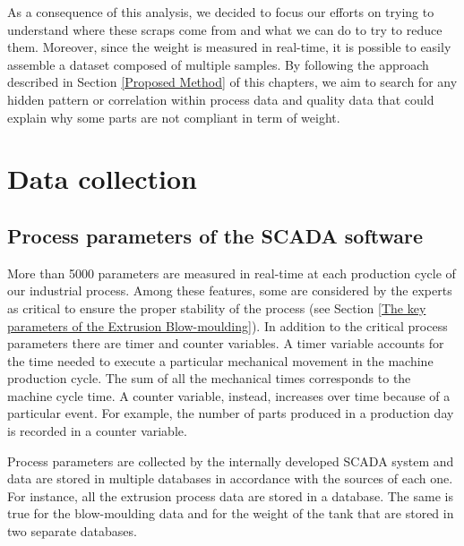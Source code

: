 As a consequence of this analysis, we decided to focus our efforts on trying to understand where these scraps come from and what we can do to try to reduce them. Moreover, since the weight is measured in real-time, it is possible to easily assemble a dataset composed of multiple samples. By following the approach described in Section \ref{Proposed Method} of this chapters, we aim to search for any hidden pattern or correlation within process data and quality data that could explain why some parts are not compliant in term of weight.


\section{Data collection}

\subsection{Process parameters of the SCADA software}

More than 5000 parameters are measured in real-time at each production cycle of our industrial process. Among these features, some are considered by the experts as critical to ensure the proper stability of the process (see Section \ref{The key parameters of the Extrusion Blow-moulding}). In addition to the critical process parameters there are timer and counter variables. A timer variable accounts for the time needed to execute a particular mechanical movement in the machine production cycle. The sum of all the mechanical times corresponds to the machine cycle time. A counter variable, instead, increases over time because of a particular event. For example, the number of parts produced in a production day is recorded in a counter variable.  

Process parameters are collected by the internally developed SCADA system and data are stored in multiple databases in accordance with the sources of each one. For instance, all the extrusion process data are stored in a database. The same is true for the blow-moulding data and for the weight of the tank that are stored in two separate databases. 

